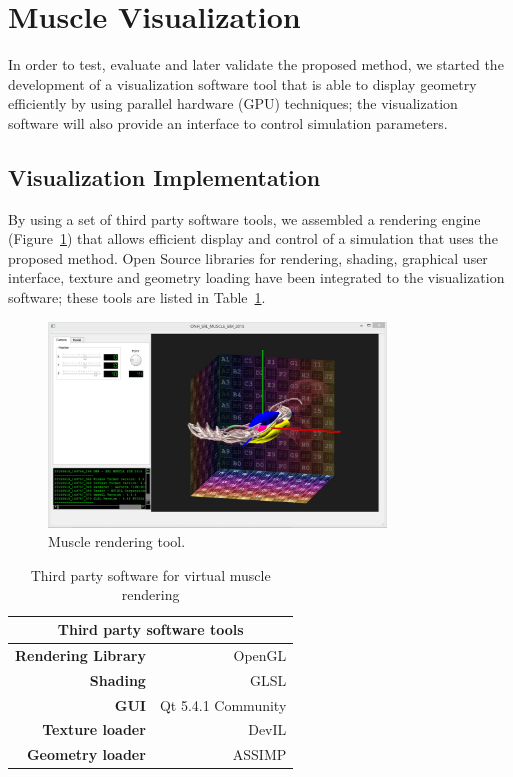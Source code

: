 \section{Muscle Visualization}
\label{sec:muscleVis}
In order to test, evaluate and later validate the proposed method, we started the development of a visualization software tool that is able to display geometry efficiently by using parallel hardware (GPU) techniques; the visualization software will also provide an interface to control simulation parameters.


\subsection{Visualization Implementation}

By using a set of third party software tools, we assembled a rendering engine (Figure~\ref{fig:muscleVis}) that allows efficient display and control of a simulation that uses the proposed method. Open Source libraries for rendering, shading, graphical user interface, texture and geometry loading have been integrated to the visualization software; these tools are listed in Table~\ref{tab:thirdSw}.

\begin{figure}[!t]
	\centering
		\includegraphics[width=0.8\textwidth]{./Figures/viewConfig.jpg}
	\caption[Muscle rendering.]{Muscle rendering tool.}
	\label{fig:muscleVis}
\end{figure}

\begin{table}[htbp]
  \centering
  \caption{Third party software for virtual muscle rendering}
    \begin{tabular}{rr}
    \toprule
    \multicolumn{2}{c}{\textbf{Third party software tools}} \\
    \midrule
    \textbf{Rendering Library} & OpenGL \\
    \textbf{Shading} & GLSL \\
    \textbf{GUI} & Qt 5.4.1 Community \\
    \textbf{Texture loader} & DevIL \\
    \textbf{Geometry loader} & ASSIMP \\
    \bottomrule
    \end{tabular}%
  \label{tab:thirdSw}%
\end{table}%

